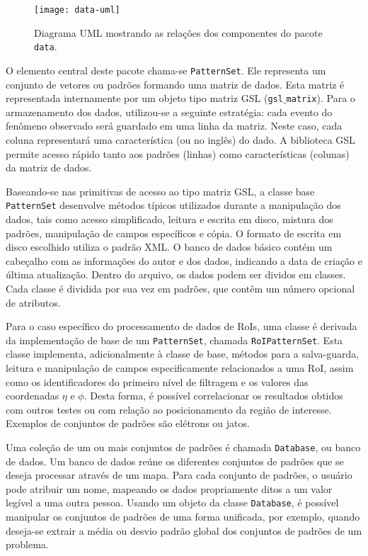 \begin{figure}
\begin{center}
\texttt{[image: data-uml]}
\end{center}
\caption{Diagrama UML mostrando as relações dos componentes do pacote
\texttt{data}.}
\label{fig:data-uml}
\end{figure}

O elemento central deste pacote chama-se \texttt{PatternSet}. Ele representa
um conjunto de vetores ou padrões formando uma matriz de dados. Esta matriz é
representada internamente por um objeto tipo matriz GSL
(\texttt{gsl$\_$matrix}). Para o armazenamento dos dados, utilizou-se a
seguinte estratégia: cada evento do fenômeno observado será guardado em uma
linha da matriz. Neste caso, cada coluna representará uma característica (ou
 no inglês) do dado. A biblioteca GSL permite acesso rápido tanto
aos padrões (linhas) como características (colunas) da matriz de dados. 

Baseando-se nas primitivas de acesso ao tipo matriz GSL, a classe base
\texttt{PatternSet} desenvolve mé\-todos tí\-picos utilizados durante a
manipulação dos dados, tais como acesso simplificado, leitura e escrita em
disco, mistura dos padrões, manipulação de campos específicos e cópia. O
formato de escrita em disco escolhido utiliza o padrão XML. O banco de dados
básico contém um cabeçalho com as informações do autor e dos dados, indicando
a data de criação e última atualização. Dentro do arquivo, os dados podem ser
dividos em classes. Cada classe é dividida por sua vez em padrões, que contêm
um número opcional de atributos.

Para o caso específico do processamento de dados de RoIs, uma classe é
derivada da implementação de base de um \texttt{PatternSet}, chamada
\texttt{RoIPatternSet}. Esta classe implementa, adicionalmente à classe de
base, métodos para a salva-guarda, leitura e manipulação de campos
especificamente relacionados a uma RoI, assim como os identificadores do
primeiro nível de filtragem e os valores das coordenadas $\eta$ e $\phi$.
Desta forma, é possível correlacionar os resultados obtidos com outros testes
ou com relação ao posicionamento da região de interesse. Exemplos de conjuntos
de padrões são elétrons ou jatos.

Uma coleção de um ou mais conjuntos de padrões é chamada \texttt{Database}, ou
banco de dados. Um banco de dados reúne os diferentes conjuntos de padrões que
se deseja processar através de um mapa. Para cada conjunto de padrões, o
usuário pode atribuir um nome, mapeando os dados propriamente ditos a um valor
legível a uma outra pessoa. Usando um objeto da classe \texttt{Database}, é
possível manipular os conjuntos de padrões de uma forma unificada, por
exemplo, quando deseja-se extrair a média ou desvio padrão global dos
conjuntos de padrões de um problema.

